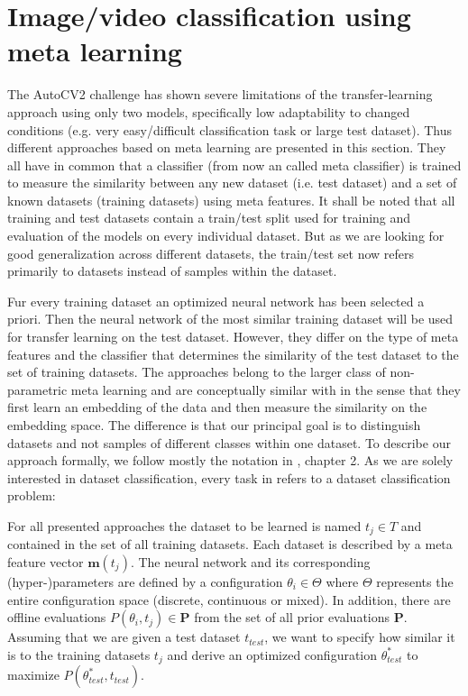 \documentclass{article}
\begin{document}
\section{Image/video classification using meta learning}
\label{sec:ml}

The AutoCV2 challenge has shown severe limitations of the transfer-learning approach using only two models, specifically low adaptability to changed conditions (e.g. very easy/difficult classification task or large test dataset). Thus different approaches based on meta learning are presented in this section. They all have in common that a classifier (from now an called meta classifier) is trained to measure the similarity between any new dataset (i.e. test dataset) and a set of known datasets (training datasets) using meta features. It shall be noted that all training and test datasets contain a train/test split used for training and evaluation of the models on every individual dataset. But as we are looking for good generalization across different datasets, the train/test set now refers primarily to datasets instead of samples within the dataset.

Fur every training dataset an optimized neural network has been selected a priori. Then the neural network of the most similar training dataset will be used for transfer learning on the test dataset. However, they differ on the type of meta features and the classifier that determines the similarity of the test dataset to the set of training datasets. The approaches belong to the larger class of non-parametric meta learning and are conceptually similar with \cite{vinyals16, snell17, sung18} in the sense that they first learn an embedding of the data and then measure the similarity on the embedding space. The difference is that our principal goal is to distinguish datasets and not samples of different classes within one dataset. To describe our approach formally, we follow mostly the notation in \cite{hutter19}, chapter 2. As we are solely interested in dataset classification, every task in \cite{hutter19} refers to a dataset classification problem:

For all presented approaches the dataset to be learned is named $t_j \in T$ and contained in the set of all training datasets. Each dataset is described by a meta feature vector $\mathbf{m}(t_j)$. The neural network and its corresponding (hyper-)parameters are defined by a configuration $\theta_i \in \Theta$ where $\Theta$ represents the entire configuration space (discrete, continuous or mixed). In addition, there are offline evaluations $P(\theta_i, t_j) \in \mathbf{P}$ from the set of all prior evaluations $\mathbf{P}$. Assuming that we are given a test dataset $t_{test}$, we want to specify how similar it is to the training datasets $t_j$ and derive an optimized configuration $\theta^*_{test}$ to maximize $P(\theta^*_{test}, t_{test})$.
\end{document}
